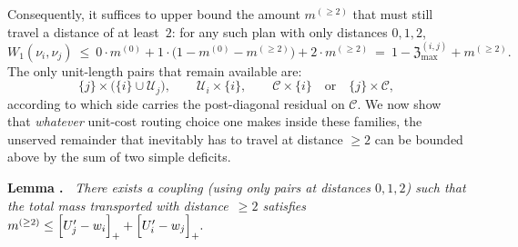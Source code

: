 \documentclass[twoside,11pt]{article}
\makeatletter
\numberwithin{equation}{section}
\numberwithin{theorem}{section}
\numberwithin{example}{section}
\newenvironment{lemmast}[1][]%
  {\par\smallskip\noindent\textbf{Lemma%
     \@ifmtarg{#1}{}{ (\textbf{#1})}.\ }%
   \itshape}
  {\par\smallskip}
\makeatother
\begin{document}
Consequently, it suffices to upper bound the amount $m^{(\ge 2)}$ that must still
travel a distance of at least~$2$: for any such plan with only distances
$0,1,2$,
\begin{equation}
\label{eq:cost-12}
W_1(\nu_i,\nu_j)\ \le\ 0\cdot m^{(0)} + 1\cdot\bigl(1-m^{(0)}-m^{(\ge 2)}\bigr)
+2\cdot m^{(\ge 2)}
\ =\ 1-\mathfrak Z_{\max}^{(i,j)} + m^{(\ge 2)}.
\end{equation}
The only unit-length pairs that remain available are:
\[
\{j\}\times\bigl(\{i\}\cup\mathcal U_j\bigr),\qquad
\mathcal U_i\times\{i\},\qquad
\mathcal C\times\{i\}\quad\text{or}\quad \{j\}\times\mathcal C,
\]
according to which side carries the post-diagonal residual on $\mathcal C$.
We now show that \emph{whatever} unit-cost routing choice one makes inside
these families, the unserved remainder that inevitably has to travel at
distance $\ge 2$ can be bounded above by the sum of two simple deficits.

\begin{lemmast}
There exists a coupling (using only pairs at distances $0,1,2$) such that the total mass transported with distance~$\ge 2$ satisfies
\(
m^{(\ge 2)} \le
\Bigl[U_j'-w_i\Bigr]_+ + \Bigl[U_i'-w_j\Bigr]_+.
\)
\end{lemmast}
\end{document}
